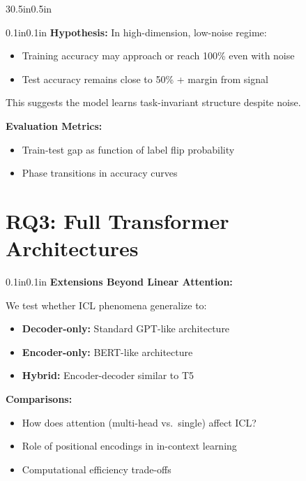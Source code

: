\documentclass[article,36pt,extrafontsizes,oneside,openany,oldfontcommands]{memoir}
\begin{document}
\begin{adjmulticols*}{3}{0.5in}{0.5in}
\begin{minipage}{.65\linewidth}
\begin{adjustwidth}{0.1in}{0.1in}
\vspace{0.15in}
\textbf{Hypothesis:} In high-dimension, low-noise regime:
\begin{itemize}[topsep=0pt,itemsep=0ex,partopsep=1ex,parsep=1ex]
\item Training accuracy may approach or reach 100\% even with noise
\item Test accuracy remains close to 50\% + margin from signal
\end{itemize}

This suggests the model learns task-invariant structure despite noise.

\vspace{0.15in}
\textbf{Evaluation Metrics:}
\begin{itemize}[topsep=0pt,itemsep=0ex,partopsep=1ex,parsep=1ex]
\item Train-test gap as function of label flip probability
\item Phase transitions in accuracy curves
\end{itemize}

\end{adjustwidth}

\end{minipage}

\section{RQ3: Full Transformer Architectures}

\begin{adjustwidth}{0.1in}{0.1in}
\textbf{Extensions Beyond Linear Attention:}

\vspace{0.15in}
We test whether ICL phenomena generalize to:
\begin{itemize}[topsep=0pt,itemsep=0ex,partopsep=1ex,parsep=1ex]
\item \textbf{Decoder-only:} Standard GPT-like architecture
\item \textbf{Encoder-only:} BERT-like architecture  
\item \textbf{Hybrid:} Encoder-decoder similar to T5
\end{itemize}

\vspace{0.15in}
\textbf{Comparisons:}
\begin{itemize}[topsep=0pt,itemsep=0ex,partopsep=1ex,parsep=1ex]
\item How does attention (multi-head vs.\ single) affect ICL?
\item Role of positional encodings in in-context learning
\item Computational efficiency trade-offs
\end{itemize}


\end{adjustwidth}
\end{adjmulticols*}
\end{document}
